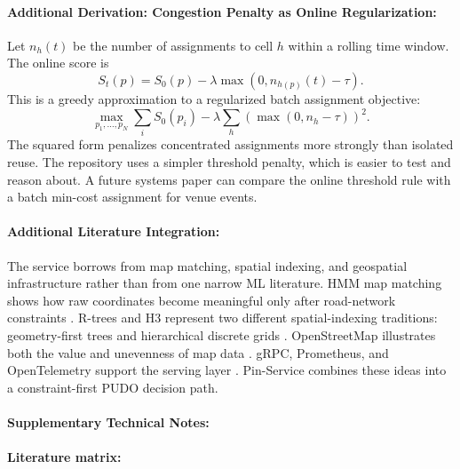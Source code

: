 \documentclass{article}
\begin{document}
\paragraph{Additional Derivation: Congestion Penalty as Online Regularization:}

Let $n_h(t)$ be the number of assignments to cell $h$ within a rolling time window. The online score is
\begin{equation}
  S_t(p)=S_0(p)-\lambda\max(0,n_{h(p)}(t)-\tau).
\end{equation}
This is a greedy approximation to a regularized batch assignment objective:
\begin{equation}
  \max_{p_1,\ldots,p_N}\sum_i S_0(p_i)-\lambda\sum_h\left(\max(0,n_h-\tau)\right)^2.
\end{equation}
The squared form penalizes concentrated assignments more strongly than isolated reuse. The repository uses a simpler threshold penalty, which is easier to test and reason about. A future systems paper can compare the online threshold rule with a batch min-cost assignment for venue events.

\paragraph{Additional Literature Integration:}

The service borrows from map matching, spatial indexing, and geospatial infrastructure rather than from one narrow ML literature. HMM map matching shows how raw coordinates become meaningful only after road-network constraints \citep{newson2009hidden}. R-trees and H3 represent two different spatial-indexing traditions: geometry-first trees and hierarchical discrete grids \citep{guttman1984rtree,h3}. OpenStreetMap illustrates both the value and unevenness of map data \citep{haklay2008osm}. gRPC, Prometheus, and OpenTelemetry support the serving layer \citep{grpc,prometheus,opentelemetry}. Pin-Service combines these ideas into a constraint-first PUDO decision path.

\paragraph{Supplementary Technical Notes:}

\paragraph{Literature matrix:}
\end{document}
